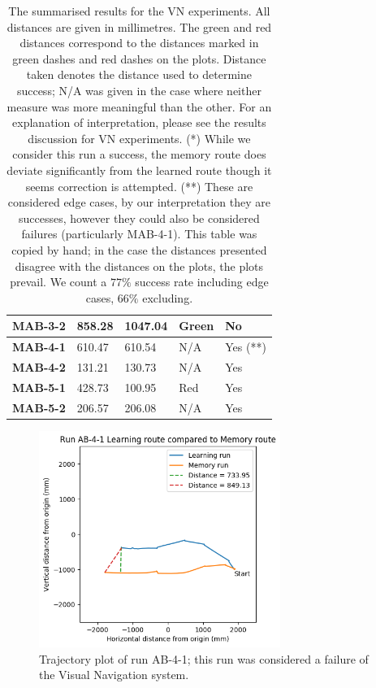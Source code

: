 \documentclass[a4paper,11pt,twoside,openright]{article}
\begin{document}
\begin{table}[]
\begin{tabular}{|l|l|l|l|l|}
\textbf{MAB-3-2} & 858.28                  & 1047.04               & Green                   & No               \\ \hline
\textbf{MAB-4-1} & 610.47                  & 610.54                & N/A                     & Yes (**)         \\ \hline
\textbf{MAB-4-2} & 131.21                  & 130.73                & N/A                     & Yes              \\ \hline
\textbf{MAB-5-1} & 428.73                  & 100.95                & Red                     & Yes              \\ \hline
\textbf{MAB-5-2} & 206.57                  & 206.08                & N/A                     & Yes              \\ \hline
\end{tabular}

\caption{\label{tab:vnres} The summarised results for the VN experiments. All distances are given in millimetres. The green and
  red distances correspond to the distances marked in green dashes and red dashes on the plots. Distance taken denotes the
  distance used to determine success; N/A was given in the case where neither measure was more meaningful than the other.
  For an explanation of interpretation, please see the results discussion for VN experiments. (*) While
  we consider this run a success, the memory route does deviate significantly from the learned route though it seems correction is attempted.
  (**) These are considered edge cases, by our interpretation they are successes, however they could also be considered failures (particularly
  MAB-4-1). This table was copied by hand; in the case the distances presented disagree with the distances on the plots, the plots prevail.
  We count a $77\%$ success rate including edge cases, $66\%$ excluding.
}
\end{table}

\FloatBarrier
\begin{figure}
 \centering
  \includegraphics[width=0.7\textwidth]{AB-4-1}
  \caption{
    \label{fig:ab-4-1-fail} Trajectory plot of run AB-4-1; this run was considered a failure of the
    Visual Navigation system.
  }
\end{figure}
\end{document}
